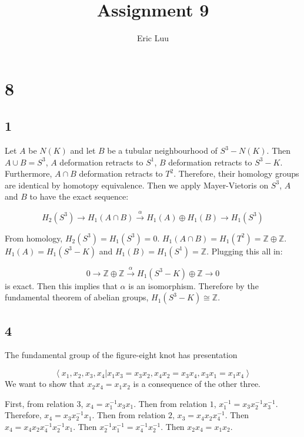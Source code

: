 \documentclass{article}
\title{Assignment 9}
\author{Eric Luu}
\theoremstyle{definition}
\numberwithin{theorem}{section}
\numberwithin{equation}{section}
\begin{document}
\section{8}
\subsection{1}

Let $A$ be $N(K)$ and let $B$ be a tubular neighbourhood of $S^3 - N(K)$. Then $A \cup B = S^3$, $A$ deformation retracts to $S^1$, $B$ deformation retracts to $S^3 - K$. Furthermore, $A \cap B$ deformation retracts to $T^2$. Therefore, their homology groups are identical by homotopy equivalence. Then we apply Mayer-Vietoris on $S^3$, $A$ and $B$ to have the exact sequence:

\begin{equation*}
    H_2(S^3) \rightarrow H_1(A \cap B) \xrightarrow{\alpha} H_1(A) \oplus H_1(B) \rightarrow H_1(S^3)
\end{equation*}

From homology, $H_2(S^3) = H_1(S^3) = 0$. $H_1(A \cap B) = H_1(T^2) = \mathbb{Z} \oplus \mathbb{Z}$. $H_1(A) = H_1(S^3 - K)$ and $H_1(B) = H_1(S^1) = \mathbb{Z}$. Plugging this all in:

\begin{equation*}
    0 \rightarrow \mathbb{Z} \oplus \mathbb{Z} \xrightarrow{\alpha} H_1(S^3 - K) \oplus \mathbb{Z} \rightarrow 0
\end{equation*}
is exact. Then this implies that $\alpha$ is an isomorphism. Therefore by the fundamental theorem of abelian groups, $H_1(S^3 - K) \cong \mathbb{Z}$. 
\subsection{4}
The fundamental group of the figure-eight knot has presentation 

\begin{equation}
    \left\langle
        x_1, x_2, x_3, x_4|
        x_1 x_3 = x_3 x_2,
        x_4 x_2 = x_3 x_4,
        x_3 x_1 = x_1 x_4
    \right\rangle
\end{equation}
We want to show that $x_2 x_4 = x_1 x_2$ is a consequence of the other three. 

First, from relation 3, $x_4 = x_1^{-1} x_3 x_1$. Then from relation $1$, $x_1^{-1} = x_3 x_2^{-1} x_3^{-1}$. Therefore, $x_4 = x_3 x_2^{-1} x_1$. Then from relation $2$, $x_3 = x_4 x_2 x_4^{-1}$. Then $x_4 = x_4 x_2 x_4^{-1} x_2^{-1} x_1$. Then $x_2^{-1} x_1^{-1} = x_4^{-1} x_2^{-1}$. Then $x_2 x_4 = x_1 x_2$.
\end{document}

